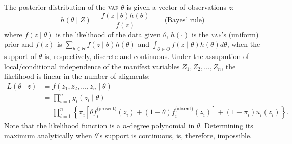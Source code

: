 \documentclass[12pt,a4paper]{article}
\numberwithin{equation}{section}
\begin{document}
The posterior distribution of the \textsc{vaf} $\theta$ is given a vector of observations $z$:
\begin{equation}
	h(\theta \mid Z) = \frac{f(z \mid \theta) h(\theta)}{f(z)} \qquad \text{(Bayes' rule)} 
\end{equation} 
where $f(z \mid \theta)$ is the likelihood of the data given $\theta$, $h(\cdot)$ is the \textsc{vaf}'s (uniform) prior and $f(z)$ is 
$\sum_{\theta \in \Theta} f(z \mid \theta) h(\theta)$ and $\int_{\theta \in \Theta} f(z \mid \theta) h(\theta) d\theta$, when the support of $\theta$ is, respectively, discrete and continuous. Under the assupmtion of local/conditional independence of the manifest variables $Z_1, Z_2, \dots, Z_n$, the likelihood is linear in the number of aligments: 
\begin{equation}
	\begin{aligned}
	L(\theta \mid z)& = f(z_1, z_2, \dots, z_n \mid \theta)  \\ 
			& = \prod_{i = 1}^n g_i (z_i \mid \theta) \\
			& = \prod_{i = 1}^n \left\{\pi_i \left[\theta f_i^{\text{(present)}}(z_i) + \left(1 - \theta \right) f_i^{\text{(absent)}}(z_i) \right] + \left(1 - \pi_i \right) u_i(z_i) \right\}.
	\end{aligned}
\end{equation}
Note that the likelihood function is a $n$-degree polynomial in $\theta$. Determining its maximum analytically when $\theta$'s support is continuous, is, therefore, impossible. 
\end{document}
